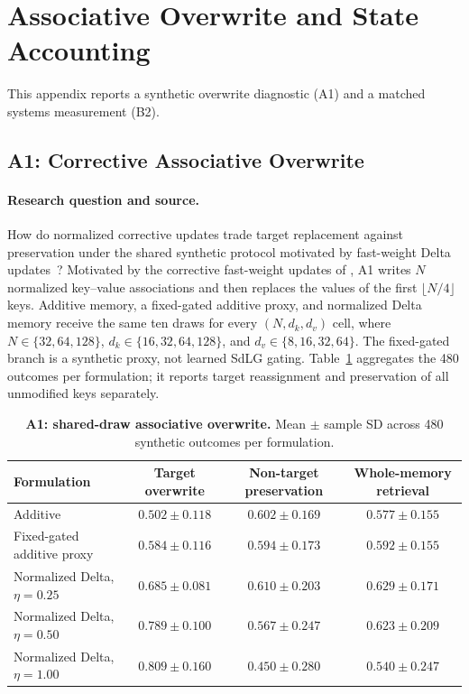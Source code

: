 \clearpage
\section{Associative Overwrite and State Accounting}
\label{app:component_transfer}

This appendix reports a synthetic overwrite diagnostic (A1) and a matched systems measurement (B2).

\subsection{A1: Corrective Associative Overwrite}
\paragraph{Research question and source.}
How do normalized corrective updates trade target replacement against preservation under the shared synthetic protocol motivated by fast-weight Delta updates~\cite{schlag2021linear}?
Motivated by the corrective fast-weight updates of \citet{schlag2021linear}, A1 writes $N$ normalized key--value associations and then replaces the values of the first $\lfloor N/4\rfloor$ keys. Additive memory, a fixed-gated additive proxy, and normalized Delta memory receive the same ten draws for every $(N,d_k,d_v)$ cell, where $N\in\{32,64,128\}$, $d_k\in\{16,32,64,128\}$, and $d_v\in\{8,16,32,64\}$. The fixed-gated branch is a synthetic proxy, not learned SdLG gating. Table~\ref{tab:overwrite_transfer} aggregates the 480 outcomes per formulation; it reports target reassignment and preservation of all unmodified keys separately.

\begin{table}[ht]
\centering\small
\caption{\textbf{A1: shared-draw associative overwrite.} Mean $\pm$ sample SD across 480 synthetic outcomes per formulation.}
\label{tab:overwrite_transfer}
\begin{tabular}{lccc}
\toprule
Formulation & Target overwrite & Non-target preservation & Whole-memory retrieval \\
\midrule
Additive & $0.502\pm0.118$ & $0.602\pm0.169$ & $0.577\pm0.155$ \\
Fixed-gated additive proxy & $0.584\pm0.116$ & $0.594\pm0.173$ & $0.592\pm0.155$ \\
Normalized Delta, $\eta=0.25$ & $0.685\pm0.081$ & $0.610\pm0.203$ & $0.629\pm0.171$ \\
Normalized Delta, $\eta=0.50$ & $0.789\pm0.100$ & $0.567\pm0.247$ & $0.623\pm0.209$ \\
Normalized Delta, $\eta=1.00$ & $0.809\pm0.160$ & $0.450\pm0.280$ & $0.540\pm0.247$ \\
\bottomrule
\end{tabular}
\end{table}


